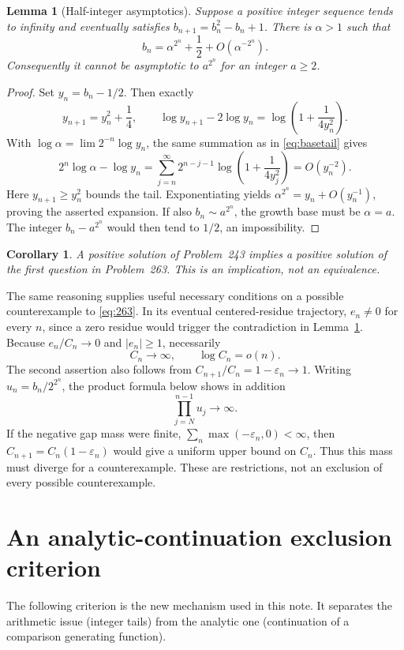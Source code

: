 \documentclass[11pt,a4paper]{article}
\newtheorem{lemma}[theorem]{Lemma}
\newtheorem{corollary}[theorem]{Corollary}
\theoremstyle{remark}\newtheorem{remark}[theorem]{Remark}
\begin{document}
\begin{lemma}[Half-integer asymptotics]\label{lem:half}
Suppose a positive integer sequence tends to infinity and eventually satisfies
$b_{n+1}=b_n^2-b_n+1$. There is $\alpha>1$ such that
\[
 b_n=\alpha^{2^n}+\frac12+O(\alpha^{-2^n}).
\]
Consequently it cannot be asymptotic to $a^{2^n}$ for an integer $a\ge2$.
\end{lemma}
\begin{proof}
Set $y_n=b_n-1/2$. Then exactly
\[
 y_{n+1}=y_n^2+\frac14,
 \qquad
 \log y_{n+1}-2\log y_n
       =\log\left(1+\frac1{4y_n^2}\right).
\]
With $\log\alpha=\lim2^{-n}\log y_n$, the same summation as in
\eqref{eq:basetail} gives
\[
 2^n\log\alpha-\log y_n
   =\sum_{j=n}^{\infty}2^{n-j-1}
         \log\left(1+\frac1{4y_j^2}\right)=O(y_n^{-2}).
\]
Here $y_{n+1}\ge y_n^2$ bounds the tail. Exponentiating yields
$\alpha^{2^n}=y_n+O(y_n^{-1})$, proving the asserted expansion.
If also $b_n\sim a^{2^n}$, the growth base must be $\alpha=a$.
The integer $b_n-a^{2^n}$ would then tend to $1/2$, an impossibility.
\end{proof}

\begin{corollary}
A positive solution of Problem~243 implies a positive solution of the first
question in Problem~263. This is an implication, not an equivalence.
\end{corollary}

The same reasoning supplies useful necessary conditions on a possible
counterexample to \eqref{eq:263}. In its eventual centered-residue trajectory,
$e_n\ne0$ for every $n$, since a zero residue would trigger the contradiction
in Lemma~\ref{lem:half}. Because $e_n/C_n\to0$ and $|e_n|\ge1$, necessarily
\begin{equation}\label{eq:necessaryC}
 C_n\longrightarrow\infty,\qquad \log C_n=o(n).
\end{equation}
The second assertion also follows from $C_{n+1}/C_n=1-\varepsilon_n\to1$.
Writing $u_n=b_n/2^{2^n}$, the product formula below shows in addition
\begin{equation}\label{eq:necessaryprod}
 \prod_{j=N}^{n-1}u_j\longrightarrow\infty.
\end{equation}
If the negative gap mass were finite,
$\sum_n\max(-\varepsilon_n,0)<\infty$, then
$C_{n+1}=C_n(1-\varepsilon_n)$ would give a uniform upper bound on $C_n$.
Thus this mass must diverge for a counterexample. These are restrictions,
not an exclusion of every possible counterexample.

\section{An analytic-continuation exclusion criterion}
The following criterion is the new mechanism used in this note. It separates
the arithmetic issue (integer tails) from the analytic one (continuation of
a comparison generating function).
\end{document}
